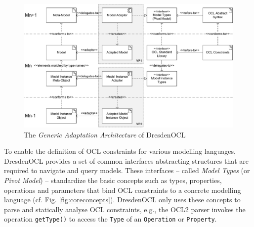 	\begin{figure}[!t]
			\centering
				\includegraphics[width=1.00\textwidth]{figures/modeladaptation.pdf}
			\caption{The \emph{Generic Adaptation Architecture} of DresdenOCL
			}
			\label{fig:modeladaptation}
		\end{figure}

	To enable the definition of OCL constraints for various modelling languages,
	DresdenOCL provides a set of common interfaces abstracting structures
	that are required to navigate and query models.
	These interfaces -- called \emph{Model Types} (or \emph{Pivot Model}) \cite{braeuerOCL07} -- standardize
	the basic	concepts such as types, properties, operations and parameters
	that bind OCL constraints to a concrete modelling language (cf. Fig. \ref{fig:coreconcepts}).
	DresdenOCL only	uses these concepts to parse and statically analyse OCL constraints, 
	e.g., the OCL2 parser	invokes the operation \texttt{getType()} to access the \texttt{Type} of 
	an \texttt{Operation} or \texttt{Property}.
	
